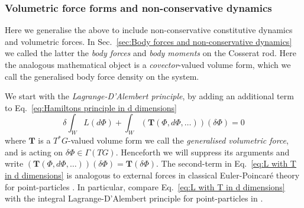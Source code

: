 \subsubsection*{Volumetric force forms and non-conservative dynamics}

Here we generalise the above to include non-conservative constitutive dynamics and volumetric forces. In Sec.~\ref{sec:Body forces and non-conservative dynamics} we called the latter the \textit{body forces} and \textit{body moments} on the Cosserat rod. Here the analogous mathematical object is a \textit{covector}-valued volume form, which we call the generalised body force density on the system.

We start with the \textit{Lagrange-D'Alembert principle}, by adding an additional term to Eq.~\ref{eq:Hamiltons principle in d dimensions}
\begin{equation} \label{eq:L with T in d dimensions}
\delta \int_W L(d\Phi) + \int_W (\mathbf{T}(\Phi, d \Phi, \dots))(\delta \Phi) = 0
\end{equation}
where $\mathbf{T}$ is a $T^*G$-valued volume form we call the \textit{generalised volumetric force}, and is acting on $\delta \Phi \in \Gamma(TG)$. Henceforth we will suppress its arguments and write $(\mathbf{T}(\Phi, d\Phi, \dots))(\delta \Phi) = \mathbf{T}(\delta \Phi)$. The second-term in Eq.~\ref{eq:L with T in d dimensions} is analogous to external forces in classical Euler-Poincaré theory for point-particles \citep{marleHenriPoincareNote2013, marsdenIntroductionMechanicsSymmetry2013}. In particular, compare Eq.~\ref{eq:L with T in d dimensions} with the integral Lagrange-D'Alembert principle for point-particles in \citep[Eq.~7.8.5]{marsdenIntroductionMechanicsSymmetry2013}.

